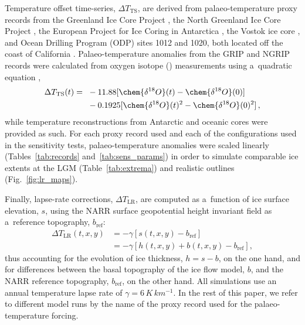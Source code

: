 \documentclass[tc, manuscript]{copernicus}
\begin{document}
      Temperature offset time-series, ${\Delta}T_{\text{TS}}$, are derived
      from palaeo-temperature proxy records from the Greenland Ice Core
      Project \citep[GRIP,][]{Dansgaard.etal.1993}, the North Greenland Ice
      Core Project \citep[NGRIP,][]{Andersen.etal.2004}, the European
      Project for Ice Coring in Antarctica \citep[EPICA,][]
      {Jouzel.etal.2007}, the Vostok ice core \citep{Petit.etal.1999}, and
      Ocean Drilling Program (ODP) sites 1012 and 1020, both located off the
      coast of California \citep{Herbert.etal.2001}. Palaeo-temperature
      anomalies from the GRIP and NGRIP records were calculated from oxygen
      isotope () measurements using a~quadratic equation
      \citep{Johnsen.etal.1995},
\begin{align}
{\Delta}T_{\text{TS}}(t) ={~}&-11.88 [\chem{\delta^{18}O}(t)
                                -\chem{\delta^{18}O}(0)] \nonumber \\
                        &-0.1925[\chem{\delta^{18}O}(t)^2
                                 -\chem{\delta^{18}O}(0)^2] \,,
\end{align}
      while temperature reconstructions from Antarctic and oceanic cores
      were provided as such. For each proxy record used and each of the
      configurations used in the sensitivity tests, palaeo-temperature
      anomalies were scaled linearly (Tables~\ref{tab:records}
      and~\ref{tab:sens_params}) in order to simulate comparable ice extents
      at the LGM (Table~\ref{tab:extrema}) and realistic outlines
      (Fig.~\ref{fig:lr_maps}).

      Finally, lapse-rate corrections, ${\Delta}T_{\text{LR}}$, are computed
      as a~function of ice surface elevation, $s$, using the NARR surface
      geopotential height invariant field as a~reference topography,
      $b_{\text{ref}}$:
\begin{align}
{\Delta}T_{\text{LR}}(t, x, y) &= -\gamma [s(t, x, y)-b_{\text{ref}}] \\
                            &= -\gamma [h(t, x, y)+b(t, x, y)-b_{\text{ref}}],
\end{align}
      thus accounting for the evolution of ice thickness, ${h=s-b}$, on the
      one hand, and for differences between the basal topography of the ice
      flow model, $b$, and the NARR reference topography, $b_{\text{ref}}$,
      on the other hand. All simulations use an annual temperature lapse
      rate of $\gamma = 6\,\unit{K\,km^{-1}}$. In the rest of this paper, we
      refer to different model runs by the name of the proxy record used for
      the palaeo-temperature forcing.
\end{document}
